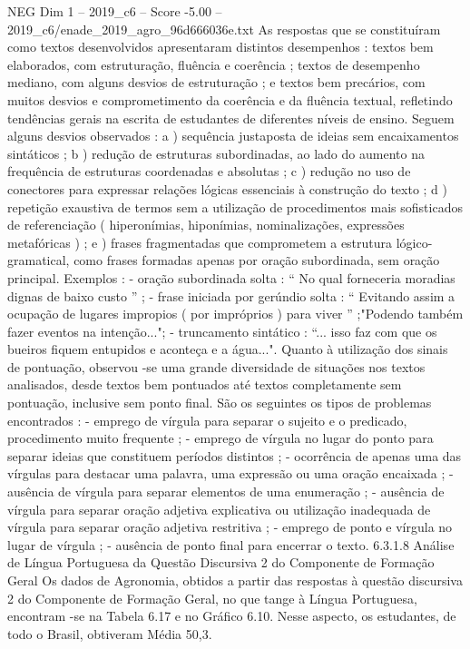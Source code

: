 \begin{textsample}{NEG Dim 1 – 2019\_c6 – Score -5.00 – 2019\_c6/enade\_2019\_agro\_96d666036e.txt}
As respostas que se constituíram como textos desenvolvidos apresentaram distintos desempenhos : textos bem elaborados, com estruturação, fluência e coerência ; textos de desempenho mediano, com alguns desvios de estruturação ; e textos bem precários, com muitos desvios e comprometimento da coerência e da fluência textual, refletindo tendências gerais na escrita de estudantes de diferentes níveis de ensino.
Seguem alguns desvios observados : a ) sequência justaposta de ideias sem encaixamentos sintáticos ; b ) redução de estruturas subordinadas, ao lado do aumento na frequência de estruturas coordenadas e absolutas ; c ) redução no uso de conectores para expressar relações lógicas essenciais à construção do texto ; d ) repetição exaustiva de termos sem a utilização de procedimentos mais sofisticados de referenciação ( hiperonímias, hiponímias, nominalizações, expressões metafóricas ) ; e ) frases fragmentadas que comprometem a estrutura lógico-gramatical, como frases formadas apenas por oração subordinada, sem oração principal.
Exemplos : - oração subordinada solta : “ No qual forneceria moradias dignas de baixo custo ” ; - frase iniciada por gerúndio solta : “ Evitando assim a ocupação de lugares impropios ( por impróprios ) para viver ” ;"Podendo também fazer eventos na intenção..."; - truncamento sintático : “... isso faz com que os bueiros fiquem entupidos e aconteça e a água...".
Quanto à utilização dos sinais de pontuação, observou -se uma grande diversidade de situações nos textos analisados, desde textos bem pontuados até textos completamente sem pontuação, inclusive sem ponto final.
São os seguintes os tipos de problemas encontrados : - emprego de vírgula para separar o sujeito e o predicado, procedimento muito frequente ; - emprego de vírgula no lugar do ponto para separar ideias que constituem períodos distintos ; - ocorrência de apenas uma das vírgulas para destacar uma palavra, uma expressão ou uma oração encaixada ; - ausência de vírgula para separar elementos de uma enumeração ; - ausência de vírgula para separar oração adjetiva explicativa ou utilização inadequada de vírgula para separar oração adjetiva restritiva ; - emprego de ponto e vírgula no lugar de vírgula ; - ausência de ponto final para encerrar o texto. 6.3.1.8 Análise de Língua Portuguesa da Questão Discursiva 2 do Componente de Formação Geral Os dados de Agronomia, obtidos a partir das respostas à questão discursiva 2 do Componente de Formação Geral, no que tange à Língua Portuguesa, encontram -se na Tabela 6.17 e no Gráfico 6.10.
Nesse aspecto, os estudantes, de todo o Brasil, obtiveram Média 50,3.

\end{textsample}
